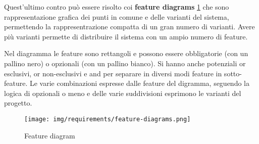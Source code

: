 Quest'ultimo contro può essere risolto coi \textbf{feature diagrams} \ref{fig:feature-diagram} che sono
rappresentazione grafica dei punti in comune e delle varianti del sistema, permettendo
la rappresentrazione compatta di un gran numero di varianti. Avere più varianti
permette di distribuire il sistema con un ampio numero di feature.

Nel diagramma le feature sono rettangoli e possono essere obbligatorie (con un
pallino nero) o opzionali (con un pallino bianco). Si hanno anche potenziali or
esclusivi, or non-esclusivi e and per separare in diversi modi feature in sotto-feature.
Le varie combinazioni espresse dalle feature del digramma, seguendo la logica di
opzionali o meno e delle varie suddivisioni esprimono le varianti del progetto.

\begin{figure}[!ht]
      \centering
      \texttt{[image: img/requirements/feature-diagrams.png]}
      \caption{Feature diagram}
      \label{fig:feature-diagram}
\end{figure}